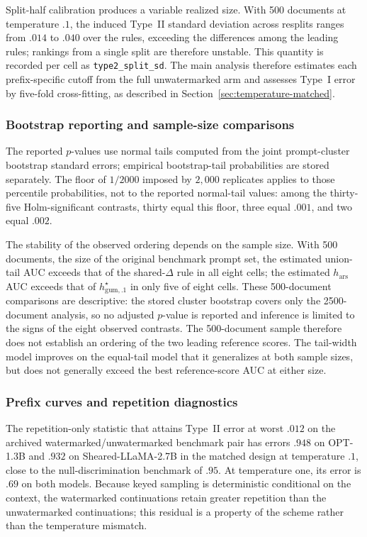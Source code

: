 \documentclass[11pt]{article}
\begin{document}
Split-half calibration produces a variable realized size.  With 500 documents at temperature $.1$, the induced Type~II standard deviation across resplits ranges from $.014$ to $.040$ over the rules, exceeding the differences among the leading rules; rankings from a single split are therefore unstable.  This quantity is recorded per cell as \texttt{type2\_split\_sd}.
The main analysis therefore estimates each prefix-specific cutoff from the
full unwatermarked arm and assesses Type~I error by five-fold cross-fitting,
as described in Section~\ref{sec:temperature-matched}.

\subsubsection{Bootstrap reporting and sample-size comparisons}
\label{sec:matched-inference-details}

The reported $p$-values use normal tails computed from the joint prompt-cluster
bootstrap standard errors; empirical bootstrap-tail probabilities are stored
separately.  The floor of $1/2000$ imposed by $2{,}000$ replicates applies to those percentile probabilities, not to the reported normal-tail values: among the thirty-five Holm-significant contrasts, thirty equal this floor, three equal $.001$, and two equal $.002$.

The stability of the observed ordering depends on the sample size.  With 500 documents, the size of the original benchmark prompt set, the estimated union-tail AUC exceeds that of the shared-$\Delta$ rule in all eight cells; the estimated $h_{\mathrm{ars}}$ AUC exceeds that of $h^\star_{\mathrm{gum},.1}$ in only five of eight cells.  These 500-document comparisons are descriptive: the stored cluster bootstrap covers only the 2500-document analysis, so no adjusted $p$-value is reported and inference is limited to the signs of the eight observed contrasts.  The 500-document sample therefore does not establish an ordering of the two leading reference scores.  The tail-width model improves on the equal-tail model that it generalizes at both sample sizes, but does not generally exceed the best reference-score AUC at either size.

\subsubsection{Prefix curves and repetition diagnostics}
\label{sec:temperature-prefix-details}

The repetition-only statistic that attains Type~II error at worst $.012$ on the archived watermarked/unwatermarked benchmark pair has errors $.948$ on OPT-1.3B and $.932$ on Sheared-LLaMA-2.7B in the matched design at temperature $.1$, close to the null-discrimination benchmark of $.95$.  At temperature one, its error is $.69$ on both models.  Because keyed sampling is deterministic conditional on the context, the watermarked continuations retain greater repetition than the unwatermarked continuations; this residual is a property of the scheme rather than the temperature mismatch.
\end{document}
